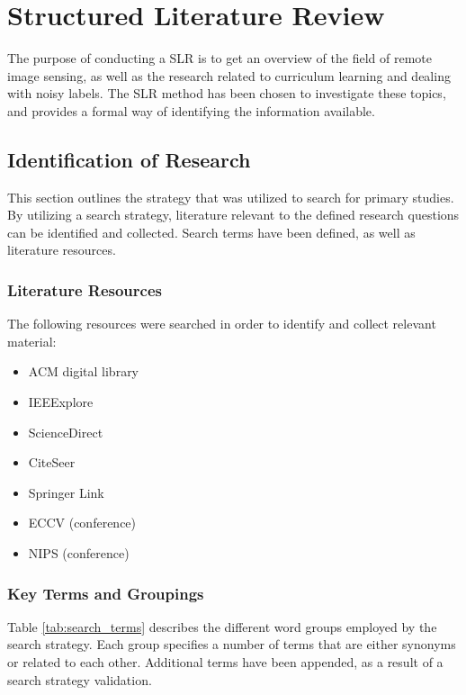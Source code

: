 \section{Structured Literature Review}
\label{sec:slr}
The purpose of conducting a \ac{SLR} is to get an overview of the field of remote image sensing, as well as the research related to curriculum learning and dealing with noisy labels. The \ac{SLR} method has been chosen to investigate these topics, and provides a formal way of identifying the information available.

\subsection{Identification of Research}
This section outlines the strategy that was utilized to search for primary studies. By utilizing a search strategy, literature relevant to the defined research questions can be identified and collected. Search terms have been defined, as well as literature resources.

\subsubsection{Literature Resources}
\label{sec:literature_resources}
The following resources were searched in order to identify and collect relevant material:
\begin{itemize}
	\item ACM digital library
	\item IEEExplore
	\item ScienceDirect
	\item CiteSeer
	\item Springer Link
	\item ECCV (conference)
	\item NIPS (conference)
\end{itemize}

\subsubsection{Key Terms and Groupings}
Table \ref{tab:search_terms} describes the different word groups employed by the search strategy. Each group specifies a number of terms that are either synonyms or related to each other. Additional terms have been appended, as a result of a search strategy validation.


